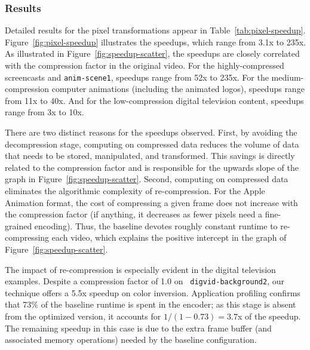 \subsubsection{Results}

Detailed results for the pixel transformations appear in
Table~\ref{tab:pixel-speedup}.  Figure~\ref{fig:pixel-speedup}
illustrates the speedups, which range from 3.1x to 235x.  As
illustrated in Figure~\ref{fig:speedup-scatter}, the speedups
are closely correlated with the compression factor in the original
video.  For the highly-compressed screencasts and {\tt anim-scene1},
speedups range from 52x to 235x.  For the medium-compression computer
animations (including the animated logos), speedups range from 11x to
40x.  And for the low-compression digital television content, speedups
range from 3x to 10x.

There are two distinct reasons for the speedups observed.  First, by
avoiding the decompression stage, computing on compressed data reduces
the volume of data that needs to be stored, manipulated, and
transformed.  This savings is directly related to the compression
factor and is responsible for the upwards slope of the graph in
Figure~\ref{fig:speedup-scatter}.  Second, computing on compressed
data eliminates the algorithmic complexity of re-compression.  For the
Apple Animation format, the cost of compressing a given frame does not
increase with the compression factor (if anything, it decreases as
fewer pixels need a fine-grained encoding).  Thus, the baseline
devotes roughly constant runtime to re-compressing each video, which
explains the positive intercept in the graph of
Figure~\ref{fig:speedup-scatter}.

The impact of re-compression is especially evident in the digital
television examples.  Despite a compression factor of 1.0 on {\tt
digvid-background2}, our technique offers a 5.5x speedup on color
inversion.  Application profiling confirms that 73\% of the baseline
runtime is spent in the encoder; as this stage is absent from the
optimized version, it accounts for $1/(1-0.73) = 3.7$x of the speedup.
The remaining speedup in this case is due to the extra frame buffer
(and associated memory operations) needed by the baseline
configuration.  
%
%

